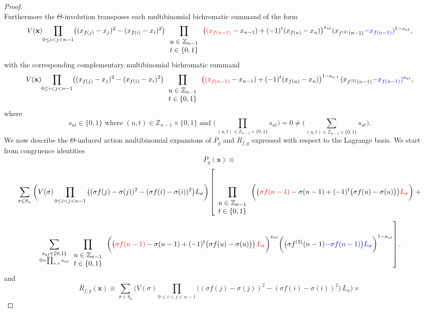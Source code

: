 \begin{proof}
\[\]
Furthermore the $\Theta$-involution transposes each multibinomial bichromatic summand of the form
\[
V(\mathbf{x})\underset{0\le i<j<n-1}{\prod}\big((x_{f(j)}-x_{j})^{2}-(x_{f(i)}-x_{i})^{2}\big)\prod_{\begin{array}{c}
u\in\mathbb{Z}_{n-1}\\
t\in\{0,1\}
\end{array}}\big({\color{red}(x_{f(n-1)}}-x_{n-1})+(-1)^{t}(x_{f(u)}-x_{u})\big)^{s_{ut}}(x_{f^{(2)}(n-1)}{\color{blue}-x_{f(n-1)}}{\color{blue})}^{1-s_{ut}},
\]
with the corresponding complementary multibinomial bichromatic summand
\[
V(\mathbf{x})\underset{0\le i<j<n-1}{\prod}\big((x_{f(j)}-x_{j})^{2}-(x_{f(i)}-x_{i})^{2}\big)\prod_{\begin{array}{c}
u\in\mathbb{Z}_{n-1}\\
t\in\{0,1\}
\end{array}}\big({\color{red}(x_{f(n-1)}}-x_{n-1})+(-1)^{t}(x_{f(u)}-x_{u})\big)^{1-s_{u,t}}\,(x_{f^{(2)}(n-1)}{\color{blue}-x_{f(n-1)}}{\color{blue})}^{s_{ut}},
\]
where
\[
s_{ut}\in\{0,1\}\text{ where }(u,t)\in\mathbb{Z}_{n-1}\times\{0,1\}\text{ and }\bigg(\prod_{(u,t)\in\mathbb{Z}_{n-1}\times\{0,1\}}s_{ut}\bigg)=0\ne\bigg(\sum_{(u,t)\in\mathbb{Z}_{n-1}\times\{0,1\}}s_{ut}\bigg).
\]
We now describe the $\Theta$-induced action multibinomial expansions of $\overline{P}_{g}$ and $\overline{R}_{f,g}$ expressed with respect to the Lagrange basis. We start from congruence identities
\[
\overline{P}_{g}(\mathbf{x})\equiv
\]
\[
\sum_{\sigma\in\text{S}_{n}}\bigg(V(\sigma)\prod_{0\le i<j<n-1}\big((\sigma f(j)-\sigma(j))^{2}-(\sigma f(i)-\sigma(i))^{2}\big)L_{\sigma}\bigg)\left[\prod_{\begin{array}{c}
u\in\mathbb{Z}_{n-1}\\
t\in\{0,1\}
\end{array}}\bigg(\big({\color{red}\sigma f(n-1)}-\sigma(n-1)+(-1)^{t}\big(\sigma f(u)-\sigma(u)\big)\big){\color{red}L_{\sigma}}\bigg)\right.+
\]
\[
\left.\sum_{\substack{s_{ut}\in\{0,1\}\\
0=\prod_{u,t}s_{ut}
}
}\prod_{\begin{array}{c}
u\in\mathbb{Z}_{n-1}\\
t\in\{0,1\}
\end{array}}\bigg(\big({\color{red}\sigma f(n-1)}-\sigma(n-1)+(-1)^{t}\big(\sigma f(u)-\sigma(u)\big)\big)\,{\color{red}L_{\sigma}}\bigg)^{s_{ut}}\bigg(\big(\sigma f^{(2)}(n-1){\color{blue}-\sigma f(n-1)}\big){\color{blue}L_{\sigma}}\bigg)^{1-s_{ut}}\right].
\]
and
\[
\overline{R}_{f,g}(\mathbf{x})\equiv\sum_{\sigma\in\text{S}_{n}}\bigg(V(\sigma)\prod_{0\le i<j<n-1}\big((\sigma f(j)-\sigma(j))^{2}-(\sigma f(i)-\sigma(i))^{2}\big)\,L_{\sigma}\bigg)\times
\]
\end{proof}
